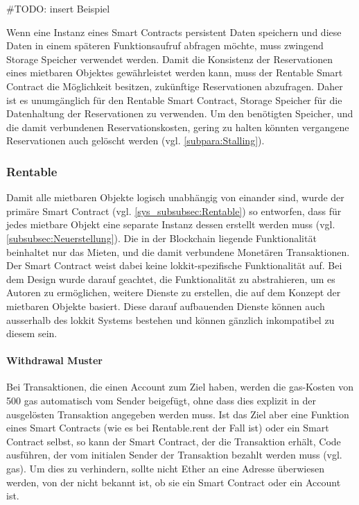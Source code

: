 \#TODO: insert Beispiel

Wenn eine Instanz eines Smart Contracts persistent Daten speichern und diese Daten in einem späteren Funktionsaufruf abfragen möchte, muss zwingend Storage Speicher verwendet werden. Damit die Konsistenz der Reservationen eines mietbaren Objektes gewährleistet werden kann, muss der Rentable Smart Contract die Möglichkeit besitzen, zukünftige Reservationen abzufragen. Daher ist es unumgänglich für den Rentable Smart Contract, Storage Speicher für die Datenhaltung der Reservationen zu verwenden. Um den benötigten Speicher, und die damit verbundenen Reservationskosten, gering zu halten könnten vergangene Reservationen auch gelöscht werden (vgl. \ref{subpara:Stalling}).

\subsubsection{Rentable}
\label{subsubsec:Rentable}
Damit alle mietbaren Objekte logisch unabhängig von einander sind, wurde der primäre Smart Contract (vgl. \ref{sys_subsubsec:Rentable}) so entworfen, dass für jedes mietbare Objekt eine separate Instanz dessen erstellt werden muss (vgl. \ref{subsubsec:Neuerstellung}). Die in der Blockchain liegende Funktionalität beinhaltet nur das Mieten, und die damit verbundene Monetären Transaktionen. Der Smart Contract weist dabei keine lokkit-spezifische Funktionalität auf. Bei dem Design wurde darauf geachtet, die Funktionalität zu abstrahieren, um es Autoren zu ermöglichen, weitere Dienste zu erstellen, die auf dem Konzept der mietbaren Objekte basiert. Diese darauf aufbauenden Dienste können auch ausserhalb des lokkit Systems bestehen und können gänzlich inkompatibel zu diesem sein.

\paragraph{Withdrawal Muster}
\label{para:Withdrawal_Muster}
Bei Transaktionen, die einen Account zum Ziel haben, werden die gas-Kosten von 500 gas automatisch vom Sender beigefügt, ohne dass dies explizit in der ausgelösten Transaktion angegeben werden muss. Ist das Ziel aber eine Funktion eines Smart Contracts (wie es bei Rentable.rent der Fall ist) oder ein Smart Contract selbst, so kann der Smart Contract, der die Transaktion erhält, Code ausführen, der vom initialen Sender der Transaktion bezahlt werden muss (vgl. gas). Um dies zu verhindern, sollte nicht Ether an eine Adresse überwiesen werden, von der nicht bekannt ist, ob sie ein Smart Contract oder ein Account ist.\cite[Wiki/Contracts and Transactions]{go-ethereum}\cite{cryptocompare.com/gas}\cite[FAQ/What is the deal with...]{solidity.readthedocs.io}

